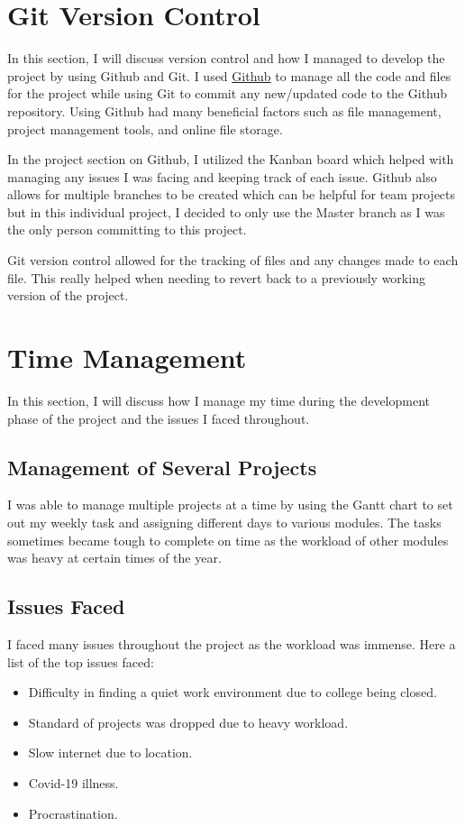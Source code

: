 \section{Git Version Control}
In this section, I will discuss version control and how I managed to develop the project by using Github and Git. I used \href{https://github.com/MarkReillyGMIT/AppliedProject}{Github} to manage all the code and files for the project while using Git to commit any new/updated code to the Github repository. Using Github had many beneficial factors such as file management, project management tools, and online file storage. 

In the project section on Github, I utilized the Kanban board which helped with managing any issues I was facing and keeping track of each issue. Github also allows for multiple branches to be created which can be helpful for team projects but in this individual project, I decided to only use the Master branch as I was the only person committing to this project.

Git version control allowed for the tracking of files and any changes made to each file. This really helped when needing to revert back to a previously working version of the project. 

\section{Time Management}
In this section, I will discuss how I manage my time during the development phase of the project and the issues I faced throughout.

\subsection{Management of Several Projects}
I was able to manage multiple projects at a time by using the Gantt chart to set out my weekly task and assigning different days to various modules. The tasks sometimes became tough to complete on time as the workload of other modules was heavy at certain times of the year. 

\subsection{Issues Faced}
I faced many issues throughout the project as the workload was immense. Here a list of the top issues faced:

\begin{itemize}
    \item Difficulty in finding a quiet work environment due to college being closed.
    \item Standard of projects was dropped due to heavy workload.
    \item Slow internet due to location.
    \item Covid-19 illness.
    \item Procrastination. 
\end{itemize}
\newpage


